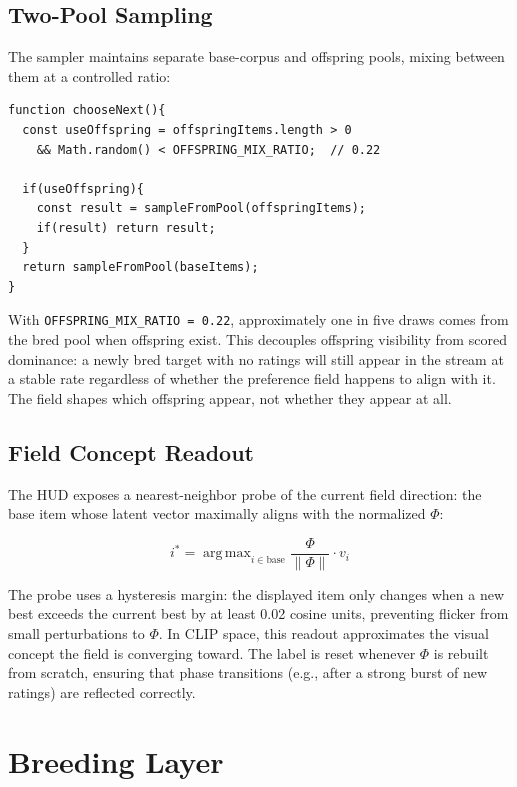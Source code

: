 \documentclass[12pt, a4paper]{article}
\DeclareMathOperator*{\argmax}{arg\,max}
\begin{document}
\subsection{Two-Pool Sampling}

The sampler maintains separate base-corpus and offspring pools, mixing between them at a controlled ratio:

\begin{lstlisting}[language={}, caption={Two-pool sampler}]
function chooseNext(){
  const useOffspring = offspringItems.length > 0
    && Math.random() < OFFSPRING_MIX_RATIO;  // 0.22

  if(useOffspring){
    const result = sampleFromPool(offspringItems);
    if(result) return result;
  }
  return sampleFromPool(baseItems);
}
\end{lstlisting}

With \texttt{OFFSPRING\_MIX\_RATIO = 0.22}, approximately one in five draws comes from the bred pool when offspring exist. This decouples offspring visibility from scored dominance: a newly bred target with no ratings will still appear in the stream at a stable rate regardless of whether the preference field happens to align with it. The field shapes which offspring appear, not whether they appear at all.

\subsection{Field Concept Readout}

The HUD exposes a nearest-neighbor probe of the current field direction: the base item whose latent vector maximally aligns with the normalized $\Phi$:

\begin{equation}
i^* = \argmax_{i \in \text{base}} \frac{\Phi}{\|\Phi\|} \cdot v_i
\end{equation}

The probe uses a hysteresis margin: the displayed item only changes when a new best exceeds the current best by at least 0.02 cosine units, preventing flicker from small perturbations to $\Phi$. In CLIP space, this readout approximates the visual concept the field is converging toward. The label is reset whenever $\Phi$ is rebuilt from scratch, ensuring that phase transitions (e.g., after a strong burst of new ratings) are reflected correctly.

\section{Breeding Layer}
\end{document}
